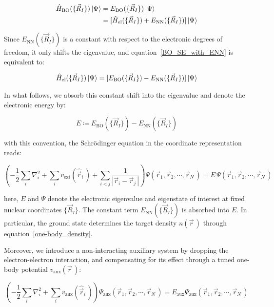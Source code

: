 \begin{equation}
\begin{aligned}
    \hat{H}_\mathrm{BO}(\{\vec{R}_I\})\ket{\Psi}
    &= E_\mathrm{BO}(\{\vec{R}_I\})\ket{\Psi} \\
    &= [\hat{H}_\mathrm{el}(\{\vec{R}_I\}) + E_\mathrm{NN}(\{\vec{R}_I\})]\ket{\Psi}
\end{aligned}
\label{BO_SE_with_ENN}
\end{equation}

Since $E_\mathrm{NN}(\{\vec{R}_I\})$ is a constant with respect to the electronic degrees of freedom, it only shifts the eigenvalue, and equation~\eqref{BO_SE_with_ENN} is equivalent to:

\begin{equation}
    \hat{H}_\mathrm{el}(\{\vec{R}_I\})\ket{\Psi}
    = [E_\mathrm{BO}(\{\vec{R}_I\}) - E_\mathrm{NN}(\{\vec{R}_I\})]\ket{\Psi}
\label{BO_SE_shift_ENN}
\end{equation}

In what follows, we absorb this constant shift into the eigenvalue and denote the electronic energy by:

\begin{equation}
    E\coloneqq E_\mathrm{BO}(\{\vec{R}_I\})-E_\mathrm{NN}(\{\vec{R}_I\})
\label{absorbed_electronic_energy}
\end{equation}

with this convention, the Schrödinger equation in the coordinate representation reads:

\begin{equation}
    \left(-\frac{1}{2}\sum_i\nabla_i^2
    + \sum_i v_{\mathrm{ext}}(\hat{\vec{r}}_i\,)
    + \sum_{i<j}\frac{1}{|\vec{r}_i - \vec{r}_j\,|}\right)\Psi(\vec{r}_1,\vec{r}_2,\cdots,\vec{r}_N\,)= E\,\Psi(\vec{r}_1,\vec{r}_2,\cdots,\vec{r}_N\,)
\label{BO_hamiltonian_SE}
\end{equation}

here, $E$ and $\Psi$ denote the electronic eigenvalue and eigenstate of interest at fixed nuclear coordinates $\{\vec{R}_I\}$.
The constant term $E_\mathrm{NN}(\{\vec{R}_I\})$ is absorbed into $E$.
In particular, the ground state determines the target density $n(\vec{r}\,)$ through equation~\eqref{one-body_density}.

Moreover, we introduce a non-interacting auxiliary system by dropping the electron-electron interaction,
and compensating for its effect through a tuned one-body potential $v_\mathrm{aux}(\vec{r}\,)$:

\begin{equation}
    \left(-\frac{1}{2}\sum_i\nabla_i^2
    + \sum_i v_\mathrm{aux}(\hat{\vec{r}}_i\,)\right)\Psi_\mathrm{aux}(\vec{r}_1,\vec{r}_2,\cdots,\vec{r}_N\,)= E_\mathrm{aux}\Psi_\mathrm{aux}(\vec{r}_1,\vec{r}_2,\cdots,\vec{r}_N\,)
\label{BO_hamiltonian_aux}
\end{equation}

